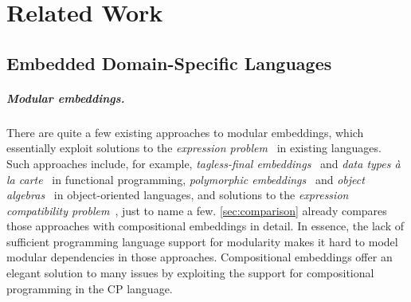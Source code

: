 \chapter{Related Work} \label{ch:related}


\section{Embedded Domain-Specific Languages}

\paragraph{Modular embeddings.}
There are quite a few existing approaches to modular embeddings, which
essentially exploit solutions to the \emph{expression
problem}~\citep{wadler1998expression} in existing languages. Such approaches
include, for example, \emph{tagless-final embeddings}~\citep{carette2009finally}
and \emph{data types à la carte}~\citep{swierstra2008data} in functional
programming, \emph{polymorphic embeddings}~\citep{hofer2008polymorphic} and
\emph{object algebras}~\citep{oliveira2012extensibility} in object-oriented
languages, and solutions to the \emph{expression compatibility
problem}~\citep{haeri2016expression,haeri2019solving}, just to name a few.
\autoref{sec:comparison} already compares those approaches with compositional
embeddings in detail. In essence, the lack of sufficient programming language
support for modularity makes it hard to model modular dependencies in those
approaches. Compositional embeddings offer an elegant solution to many issues by
exploiting the support for compositional programming in the CP language.

